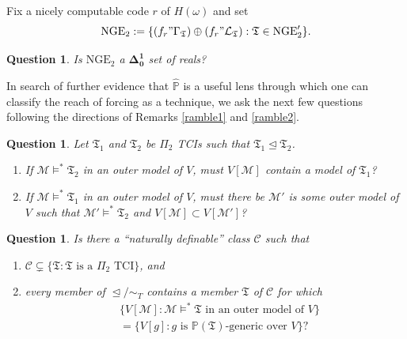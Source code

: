 \documentclass[12pt, twoside]{memoir}
\numberwithin{equation}{section}
\newtheorem{ques}[thm]{Question}
\theoremstyle{definition}
\theoremstyle{remark}
\theoremstyle{definition}
\theoremstyle{definition}
\theoremstyle{definition}
\theoremstyle{remark}
\begin{document}
Fix a nicely computable code $r$ of $H(\omega)$ and set
\begin{equation*}
    \mathrm{NGE}_2 := \{(f_r" \Gamma_{\mathfrak{T}}) \oplus (f_r" \mathcal{L}_{\mathfrak{T}}) : \mathfrak{T} \in \mathrm{NGE}'_2\} \text{.}
\end{equation*}

\begin{ques}
Is $\mathrm{NGE}_2$ a $\mathbf{\Delta^1_0}$ set of reals?
\end{ques}

In search of further evidence that $\hat{\mathbb{P}}$ is a useful lens through which one can classify the reach of forcing as a technique, we ask the next few questions following the directions of Remarks \ref{ramble1} and \ref{ramble2}.

\begin{ques}
Let $\mathfrak{T}_1$ and $\mathfrak{T}_2$ be $\Pi_2$ TCIs such that $\mathfrak{T}_1 \trianglelefteq \mathfrak{T}_2$.
\begin{enumerate}[label=(\arabic*)]
    \item If $\mathcal{M} \models^* \mathfrak{T}_2$ in an outer model of $V$, must $V[\mathcal{M}]$ contain a model of $\mathfrak{T}_1$?
    \item If $\mathcal{M} \models^* \mathfrak{T}_1$ in an outer model of $V$, must there be $\mathcal{M}'$ is some outer model of $V$ such that $\mathcal{M}' \models^* \mathfrak{T}_2$ and $V[\mathcal{M}] \subset V[\mathcal{M}']$?
\end{enumerate}
\end{ques}

\begin{ques}
Is there a ``naturally definable'' class $\mathcal{C}$ such that 
\begin{enumerate}[label=(\alph*)]
    \item $\mathcal{C} \subsetneq \{\mathfrak{T} : \mathfrak{T} \text{ is a } \Pi_2 \text{ TCI}\}$, and
    \item every member of $\trianglelefteq / \sim_T$ contains a member $\mathfrak{T}$ of $\mathcal{C}$ for which
    \begin{align*}
        & \{V[\mathcal{M}] : \mathcal{M} \models^* \mathfrak{T} \text{ in an outer model of } V\} \\
        & = \{V[g] : g \text{ is } \mathbb{P}(\mathfrak{T}) \text{-generic over } V\} \text{?}
    \end{align*}
\end{enumerate} 
\end{ques}
\end{document}
